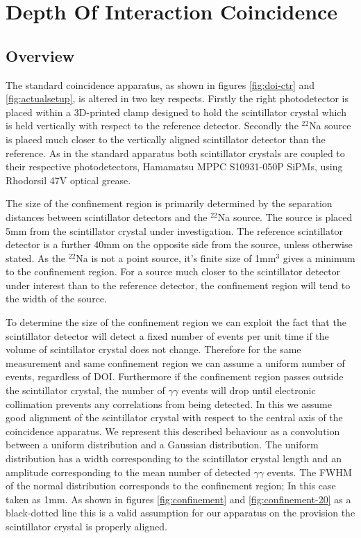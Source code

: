 \section{Depth Of Interaction Coincidence}
\subsection{Overview}
The standard coincidence apparatus, as shown in figures \ref{fig:doi-ctr} and \ref{fig:actualsetup}, is altered in two key respects. Firstly the right photodetector is placed within a 3D-printed clamp designed to hold the scintillator crystal which is held vertically with respect to the reference detector. Secondly the $^{22}$Na source is placed much closer to the vertically aligned scintillator detector than the reference. As in the standard apparatus both scintillator crystals are coupled to their respective photodetectors, Hamamatsu MPPC S10931-050P SiPMs, using Rhodorsil 47V optical grease. 

The size of the confinement region is primarily determined by the separation distances between scintillator detectors and the $^{22}$Na source. The source is placed 5mm from the scintillator crystal under investigation. The reference scintillator detector is a further 40mm on the opposite side from the source, unless otherwise stated. As the $^{22}$Na is not a point source, it's finite size of 1mm$^3$ gives a minimum to the confinement region. For a source much closer to the scintillator detector under interest than to the reference detector, the confinement region will tend to the width of the source. 

To determine the size of the confinement region we can exploit the fact that the scintillator detector will detect a fixed number of events per unit time if the volume of scintillator crystal does not change. Therefore for the same measurement and same confinement region we can assume a uniform number of events, regardless of DOI. Furthermore if the confinement region passes outside the scintillator crystal, the number of $\gamma\gamma$ events will drop until electronic collimation prevents any correlations from being detected. In this we assume good alignment of the scintillator crystal with respect to the central axis of the coincidence apparatus. We represent this described behaviour as a convolution between a uniform distribution and a Gaussian distribution. The uniform distribution has a width corresponding to the scintillator crystal length and an amplitude corresponding to the mean number of detected $\gamma\gamma$ events. The FWHM of the normal distribution corresponds to the confinement region; In this case taken as 1mm. As shown in figures \ref{fig:confinement} and \ref{fig:confinement-20} as a black-dotted line this is a valid assumption for our apparatus on the provision the scintillator crystal is properly aligned.

